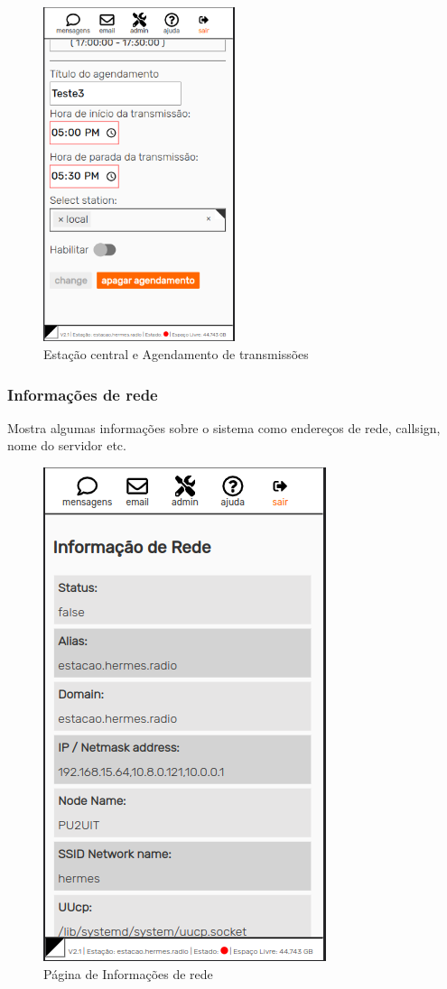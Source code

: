 \documentclass[11pt,a4paper]{article}
\begin{document}
\begin{figure}[H]
    \centering
    \includegraphics[width=0.5\textwidth]{screenshots/frontend/pt_kn/central2.png}
    \caption{Estação central e Agendamento de transmissões}
	\vspace{-10pt}
    \label{fig:central2}
\end{figure}

\subsubsection{Informações de rede} 
\label{gui_net_info}

Mostra algumas informações sobre o sistema como endereços de rede, callsign, nome do servidor etc.
     \begin{figure}[H]
     \vspace{-10pt}
    \centering
    \includegraphics[width=0.5\columnwidth]{screenshots/frontend/pt_kn/networkinfo.png}
    \caption{Página de Informações de rede}
    \label{fig:netinfo}
\end{figure}
    
\end{document}
